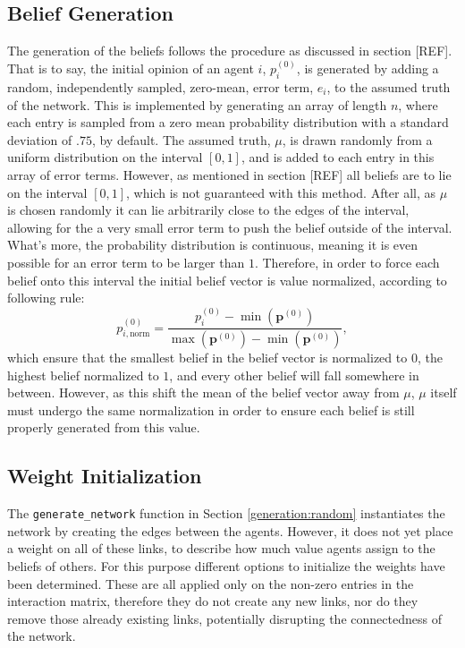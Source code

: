 \documentclass[a4paper, 12pt]{report}
\newcommand{\beli}[3][2]{p_{#2}^{(#3)}}
\begin{document}
\newpage
\subsection{Belief Generation}

The generation of the beliefs follows the procedure as discussed in section [REF]. That is to say, the initial opinion of an agent $i$, $\beli{i}{0}$, is generated by adding a random, independently sampled, zero-mean, error term, $e_i$, to the assumed truth of the network. This is implemented by generating an array of length $n$, where each entry is sampled from a zero mean probability distribution with a standard deviation of $.75$, by default. The assumed truth, $\mu$, is drawn randomly from a uniform distribution on the interval $[0, 1]$, and is added to each entry in this array of error terms. \newline
However, as mentioned in section [REF] all beliefs are to lie on the interval $[0, 1]$, which is not guaranteed with this method. After all, as $\mu$ is chosen randomly it can lie arbitrarily close to the edges of the interval, allowing for the a very small error term to push the belief outside of the interval. What's more, the probability distribution is continuous, meaning it is even possible for an error term to be larger than $1$.  Therefore, in order to force each belief onto this interval the initial belief vector is value normalized, according to following rule:
\begin{equation*}
    \beli{i, \text{norm}}{0} = \frac{\beli{i}{0} - \min(\bm{p}^{(0)})}{\max(\bm{p}^{(0)}) - \min(\bm{p}^{(0)})},
\end{equation*}
which ensure that the smallest belief in the belief vector is normalized to $0$, the highest belief normalized to $1$, and every other belief will fall somewhere in between. However, as this shift the mean of the belief vector away from $\mu$, $\mu$ itself must undergo the same normalization in order to ensure each belief is still properly generated from this value.
\newline

\subsection{Weight Initialization}
The \texttt{generate\_network} function in Section \ref{generation:random} instantiates the network by creating the edges between the agents. However, it does not yet place a weight on all of these links, to describe how much value agents assign to the beliefs of others. For this purpose different options to initialize the weights have been determined. These are all applied only on the non-zero entries in the interaction matrix, therefore they do not create any new links, nor do they remove those already existing links, potentially disrupting the connectedness of the network. 
\end{document}
